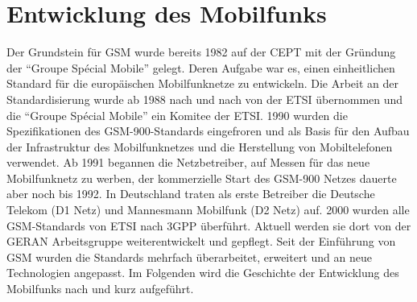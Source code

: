 \chapter{Entwicklung des Mobilfunks} \label{hdl:einleitung_entwicklung}

Der Grundstein für \ac{GSM} wurde bereits 1982 auf der \ac{CEPT} mit der Gründung der "`Groupe Spécial Mobile"' gelegt. Deren Aufgabe war es, einen einheitlichen Standard für die europäischen Mobilfunknetze zu entwickeln. Die Arbeit an der Standardisierung wurde ab 1988 nach und nach von der \ac{ETSI} übernommen und die "`Groupe Spécial Mobile"' ein Komitee der \ac{ETSI}. 1990 wurden die Spezifikationen des \ac{GSM}-900-Standards eingefroren und als Basis für den Aufbau der Infrastruktur des Mobilfunknetzes und die Herstellung von Mobiltelefonen verwendet. Ab 1991 begannen die Netzbetreiber, auf Messen für das neue Mobilfunknetz zu werben, der kommerzielle Start des \ac{GSM}-900 Netzes dauerte aber noch bis 1992. In Deutschland traten als erste Betreiber die Deutsche Telekom (D1 Netz) und Mannesmann Mobilfunk (D2 Netz) auf.
2000 wurden alle \ac{GSM}-Standards von \ac{ETSI} nach \ac{3GPP} überführt. Aktuell werden sie dort von der \ac{GERAN} Arbeitsgruppe weiterentwickelt und gepflegt.
Seit der Einführung von \ac{GSM} wurden die Standards mehrfach überarbeitet, erweitert und an neue Technologien angepasst. Im Folgenden wird die Geschichte der Entwicklung des Mobilfunks nach \citet{handyflatrate24:umts-gprs-lte-und-co} und \citet{3gpp:gsm-history} kurz aufgeführt. 


